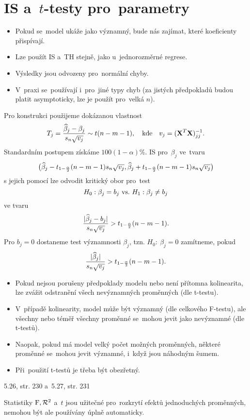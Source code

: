 \chapter{IS a~$t$-testy pro~parametry}
\begin{itemize}
	\item Pokud se~model ukáže jako významný, bude nás zajímat, které koeficienty přispívají.
	\item Lze použít IS a~TH stejně, jako u~jednorozměrné regrese.
	\item Výsledky jsou odvozeny pro~normální chyby.
	\item V~praxi se~používají i~pro~jiné typy chyb (za jistých předpokladů budou platit asymptoticky, lze je použít pro~velká $n$). 
\end{itemize}
Pro konstrukci použijeme dokázanou vlastnost
$$ T_j=\frac{\widehat{\beta}_j-\beta_j}{s_n\sqrt{v_j}}\sim t(n-m-1),\quad\text{kde}\quad v_j=(\textbf{X}^T\textbf{X})_{jj}^{-1}.$$
Standardním postupem získáme $100(1-\alpha)$\%. IS pro~$\beta_j$ ve~tvaru
$$\big( \widehat{\beta}_j-t_{1-\frac{\alpha}{2}}(n-m-1)s_n\sqrt{v_j},\widehat{\beta}_j+t_{1-\frac{\alpha}{2}}(n-m-1)s_n\sqrt{v_j} \big)$$
s jejich pomocí lze odvodit kritický obor pro~test
$$H_0: \beta_j=b_j ~\text{vs.}~ H_1: \beta_j\neq b_j$$
ve tvaru
$$ \frac{|\widehat{\beta}_j-b_j|}{s_n\sqrt{v_j}}>t_{1-\frac{\alpha}{2}}(n-m-1).$$
Pro $b_j=0$ dostaneme test významnosti $\beta_j$, tzn. $H_0:~\beta_j=0$ zamítneme, pokud 
$$ \frac{|\widehat{\beta}_j|}{s_n\sqrt{v_j}}>t_{1-\frac{\alpha}{2}}(n-m-1).$$
\begin{remark}
	\begin{itemize}
		\item Pokud nejsou porušeny předpoklady modelu nebo není přítomna kolinearita, lze zvážit odstranění všech nevýznamných proměnných (dle t-testu).
		\item V~případě kolinearity, model může být významný (dle celkového F-testu), ale všechny nebo téměř všechny proměnné se~mohou jevit jako nevýznamné (dle t-testů).
		\item Naopak, pokud má model velký počet možných proměnných, některé proměnné se~mohou jevit významné, i~když jsou náhodným šumem.
		\item Při~použití t-testů je třeba být obezřetný.
	\end{itemize}
\end{remark}
\begin{example}
	5.26, str. 230 a~5.27, str. 231
\end{example}
\begin{remark}
	Statistiky $\mathrm{F},\mathcal{R}^2$ a~$t$ jsou užitečné pro~rozkrytí efektů jednoduchých proměnných, nemohou být ale používány úplně automaticky.
\end{remark}
